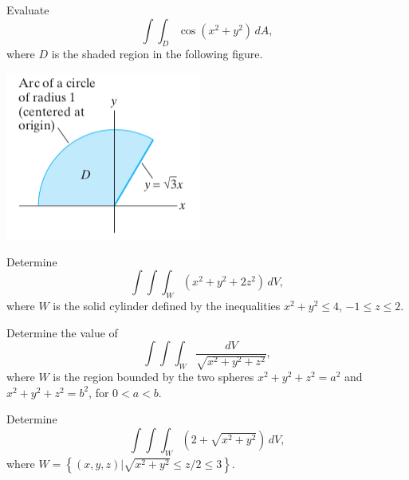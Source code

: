 \documentclass[11pt,letterpaper,boxed]{hmcpset}
\newcommand{\crb}[1]{\left\{ #1 \right\}}
\begin{document}
\begin{problem}[Colley 5.5 \#25]
Evaluate
\[
	\int\int_D \cos(x^2+y^2)\,dA,
\]
where $D$ is the shaded region in the following figure.
\begin{center}
\includegraphics[scale=0.6]{circ.png}
\end{center}
\end{problem}

\begin{solution}
\vfill
\end{solution}
\newpage

\begin{problem}[Colley 5.5 \#31]
Determine
\[
	\int\int\int_W(x^2+y^2+2z^2)\,dV,
\]
where $W$ is the solid cylinder defined by the inequalities $x^2+y^2\leq 4$, $-1\leq z\leq2.$
\end{problem}

\begin{solution}
\vfill
\end{solution}
\newpage

\begin{problem}[Colley 5.5 \#34]
Determine the value of
\[
	\int\int\int_W \frac{dV}{\sqrt{x^2+y^2+z^2}},
\]
where $W$ is the region bounded by the two spheres $x^2+y^2+z^2=a^2$ and $x^2+y^2+z^2=b^2$, for $0<a<b.$
\end{problem}

\begin{solution}
\vfill
\end{solution}
\newpage

\begin{problem}[Colley 5.5 \#38]
Determine
\[
	\int\int\int_W(2+\sqrt{x^2+y^2})\,dV,
\]
where $W = \crb{(x,y,z) | \sqrt{x^2+y^2}\leq z/2 \leq 3}.$
\end{problem}

\begin{solution}
\vfill
\end{solution}
\end{document}
